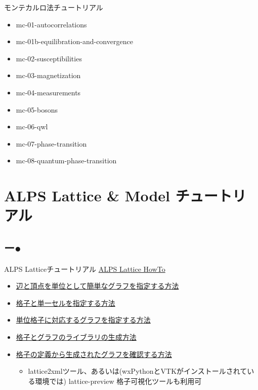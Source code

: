 \begin{frame}{モンテカルロ法チュートリアル}
  \begin{itemize}
  \item mc-01-autocorrelations
  \item mc-01b-equilibration-and-convergence
  \item mc-02-susceptibilities
  \item mc-03-magnetization
  \item mc-04-measurements
  \item mc-05-bosons
  \item mc-06-qwl
  \item mc-07-phase-transition
  \item mc-08-quantum-phase-transition
  \end{itemize}
\end{frame}

\section{ALPS Lattice \& Model チュートリアル}
\subsection*{{\protect\color{red}ー}{\protect\color{blue}●}}

\begin{frame}{ALPS Latticeチュートリアル}
  \href{http://alps.comp-phys.org/mediawiki/index.php/Tutorials:LatticeHOWTO/ja}{ALPS Lattice HowTo} \\
  \begin{itemize}
    \item \href{http://alps.comp-phys.org/mediawiki/index.php/Tutorials:LatticeHOWTO:SimpleGraphs/ja}{辺と頂点を単位として簡単なグラフを指定する方法}
    \item \href{http://alps.comp-phys.org/mediawiki/index.php/Tutorials:LatticesAndUnitCells/ja}{格子と単一セルを指定する方法}
    \item \href{http://alps.comp-phys.org/mediawiki/index.php/Tutorials:LatticesAndGraphs/ja}{単位格子に対応するグラフを指定する方法}
    \item \href{http://alps.comp-phys.org/mediawiki/index.php/Tutorials:LatticeHOWTO:Library/ja}{格子とグラフのライブラリの生成方法}
    \item \href{http://alps.comp-phys.org/mediawiki/index.php/Tutorials:LatticeHowto:CheckLattice/ja}{格子の定義から生成されたグラフを確認する方法}
      \begin{itemize}
      \item lattice2xmlツール、あるいは(wxPythonとVTKがインストールされている環境では) lattice-preview 格子可視化ツールも利用可
      \end{itemize}
  \end{itemize}
\end{frame}


